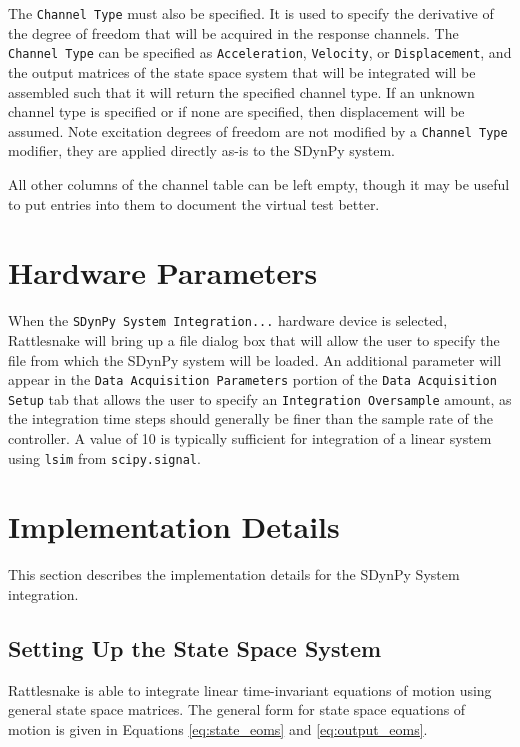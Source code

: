 \documentclass[pdf,12pt,report]{SANDreport}
\newcommand{\inlineCode}{\lstinline[basicstyle=\bfseries\ttfamily]}
\begin{document}
    The \inlineCode{Channel Type} must also be specified.  It is used to specify the derivative of the degree of freedom that will be acquired in the response channels.  The \inlineCode{Channel Type} can be specified as \inlineCode{Acceleration}, \inlineCode{Velocity}, or \inlineCode{Displacement}, and the output matrices of the state space system that will be integrated will be assembled such that it will return the specified channel type.  If an unknown channel type is specified or if none are specified, then displacement will be assumed.  Note excitation degrees of freedom are not modified by a \inlineCode{Channel Type} modifier, they are applied directly as-is to the SDynPy system.
    
    All other columns of the channel table can be left empty, though it may be useful to put entries into them to document the virtual test better.
    
    \section{Hardware Parameters}
    
    When the \inlineCode{SDynPy System Integration...} hardware device is selected, Rattlesnake will bring up a file dialog box that will allow the user to specify the file from which the SDynPy system will be loaded.  An additional parameter will appear in the \inlineCode{Data Acquisition Parameters} portion of the \inlineCode{Data Acquisition Setup} tab that allows the user to specify an \inlineCode{Integration Oversample} amount, as the integration time steps should generally be finer than the sample rate of the controller.  A value of 10 is typically sufficient for integration of a linear system using \inlineCode{lsim} from \inlineCode{scipy.signal}.
    
    \section{Implementation Details}
    
    This section describes the implementation details for the SDynPy System integration.
    
    \subsection{Setting Up the State Space System}
    
    Rattlesnake is able to integrate linear time-invariant equations of motion using general state space matrices.  The general form for state space equations of motion is given in Equations \eqref{eq:state_eoms} and \eqref{eq:output_eoms}.
    
\end{document}
